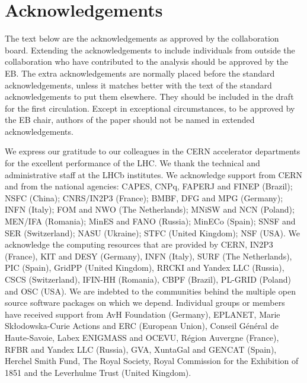 \section*{Acknowledgements}

The text below are the acknowledgements as approved by the collaboration
board. Extending the acknowledgements to include individuals from outside the
collaboration who have contributed to the analysis should be approved by the
EB. The extra acknowledgements are normally placed before the standard 
acknowledgements, unless it matches better with the text of the standard 
acknowledgements to put them elsewhere. They should be included in the draft 
for the first circulation. Except in exceptional circumstances, to be approved by the
EB chair, authors of the paper should not be named in extended acknowledgements.
 
\noindent We express our gratitude to our colleagues in the CERN
accelerator departments for the excellent performance of the LHC. We
thank the technical and administrative staff at the LHCb
institutes. We acknowledge support from CERN and from the national
agencies: CAPES, CNPq, FAPERJ and FINEP (Brazil); NSFC (China);
CNRS/IN2P3 (France); BMBF, DFG and MPG (Germany); INFN (Italy); 
FOM and NWO (The Netherlands); MNiSW and NCN (Poland); MEN/IFA (Romania); 
MinES and FANO (Russia); MinECo (Spain); SNSF and SER (Switzerland); 
NASU (Ukraine); STFC (United Kingdom); NSF (USA).
We acknowledge the computing resources that are provided by CERN, IN2P3 (France), KIT and DESY (Germany), INFN (Italy), SURF (The Netherlands), PIC (Spain), GridPP (United Kingdom), RRCKI and Yandex LLC (Russia), CSCS (Switzerland), IFIN-HH (Romania), CBPF (Brazil), PL-GRID (Poland) and OSC (USA). We are indebted to the communities behind the multiple open 
source software packages on which we depend.
Individual groups or members have received support from AvH Foundation (Germany),
EPLANET, Marie Sk\l{}odowska-Curie Actions and ERC (European Union), 
Conseil G\'{e}n\'{e}ral de Haute-Savoie, Labex ENIGMASS and OCEVU, 
R\'{e}gion Auvergne (France), RFBR and Yandex LLC (Russia), GVA, XuntaGal and GENCAT (Spain), Herchel Smith Fund, The Royal Society, Royal Commission for the Exhibition of 1851 and the Leverhulme Trust (United Kingdom).

